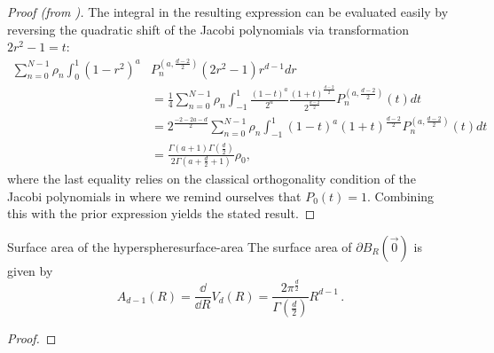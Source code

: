 \begin{proof}[Proof (from \cite{2021-arbitrary-dimensions})]
  The integral in the resulting expression can be evaluated easily by reversing the quadratic shift of the Jacobi polynomials via transformation $2r^2-1 = t$:
  \begin{align*}
    \sum_{n=0}^{N-1} \rho_{n} \int_0^1 (1-r^2)^a & P_n^{(a,\frac{d-2}{2})}(2r^2-1) r^{d-1} dr                                                                                \\&= \frac{1}{4} \sum_{n=0}^{N-1} \rho_{n} \int_{-1}^1 \frac{(1-t)^a}{2^a}\frac{(1+t)^{\frac{d-2}{2}}}{2^{\frac{d-2}{2}}} P_n^{(a,\frac{d-2}{2})}(t) dt\\
                                                 & = 2^{\frac{-2-2a-d}{2}} \sum_{n=0}^{N-1} \rho_{n} \int_{-1}^1 (1-t)^a (1+t)^{\frac{d-2}{2}} P_n^{(a,\frac{d-2}{2})}(t) dt \\
                                                 & = \frac{\Gamma (a+1) \Gamma \left(\frac{d}{2}\right)}{2 \Gamma \left(a+\frac{d}{2}+1\right)} \rho_0,
  \end{align*}
  where the last equality relies on the classical orthogonality condition of the Jacobi polynomials in  where we remind ourselves that $P_0(t) = 1$. Combining this with the prior expression yields the stated result.
\end{proof}

\begin{lemma}{Surface area of the hypersphere}{surface-area}
  The surface area of $\partial B_R(\vec{0})$ is given by
  $$A_{d-1}(R) = \frac{\dd}{\dd R} V_d(R) = \frac{2\pi^\frac{d}{2}}{\Gamma(\frac{d}{2})} R^{d-1}\,.$$
\end{lemma}
\begin{proof}
  \hierKoennteIhreWerbungStehen
\end{proof}
